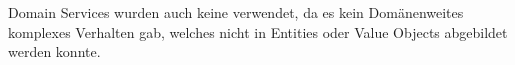 
Domain Services wurden auch keine verwendet, da es kein Domänenweites komplexes Verhalten gab, welches nicht in Entities oder Value Objects abgebildet werden konnte.












